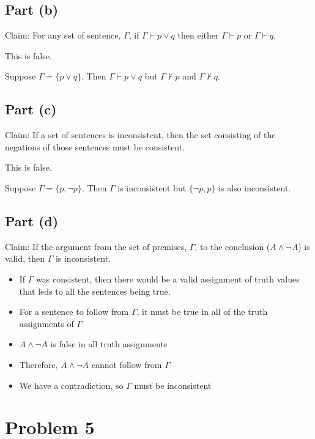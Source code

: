\documentclass[12pt]{article}
\begin{document}
\subsection*{Part (b)}

Claim: For any set of sentence, $\Gamma$, if $\Gamma \vdash p \lor q$ then either $\Gamma \vdash p$ or $\Gamma \vdash q$.

This is false.

Suppose $\Gamma = \{p \lor q\}$. Then $\Gamma \vdash p \lor q$ but $\Gamma \nvdash p$ and $\Gamma \nvdash q$.


\subsection*{Part (c)}

Claim: If a set of sentences is inconsistent, then the set consisting of the negations of those sentences must be consistent. 

This is false.

Suppose $\Gamma = \{p, \lnot p\}$. Then $\Gamma$ is inconsistent but $\{\lnot p, p\}$ is also inconsistent.


\subsection*{Part (d)}

Claim: If the argument from the set of premises, $\Gamma$, to the conclusion ($A \land \lnot A$) is valid, then $\Gamma$ is inconsistent. 

\begin{itemize}
    \item If $\Gamma$ was consistent, then there would be a valid assignment of truth values that leds to all the sentences being true. 
    \item For a sentence to follow from $\Gamma$, it must be true in all of the truth assignments of $\Gamma$
    \item $A \land \lnot A$ is false in all truth assignments
    \item Therefore, $A \land \lnot A$ cannot follow from $\Gamma$
    \item We have a contradiction, so $\Gamma$ must be inconsistent
\end{itemize}

\section*{Problem 5}
\end{document}
